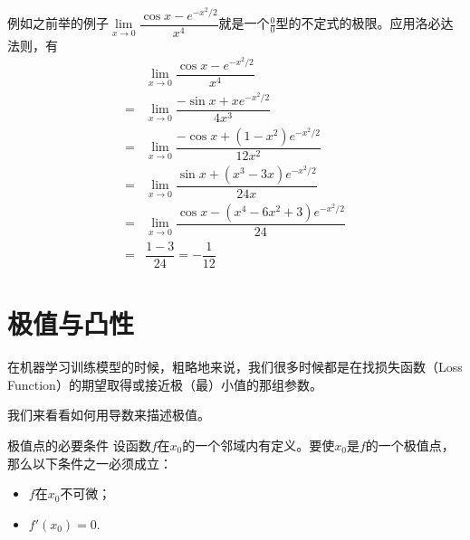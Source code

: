 
\begin{frame}

例如之前举的例子$\lim\limits_{x \to 0} \dfrac{\cos x - e^{-x^2/2}}{x^4}$就是一个$\frac{0}{0}$型的不定式的极限。应用洛必达法则，有
\begin{align*}
& \lim\limits_{x \to 0} \dfrac{\cos x - e^{-x^2/2}}{x^4} \\
= & \lim\limits_{x \to 0} \dfrac{-\sin x + xe^{-x^2/2}}{4x^3} \\
= & \lim\limits_{x \to 0} \dfrac{-\cos x + (1-x^2)e^{-x^2/2}}{12x^2} \\
= & \lim\limits_{x \to 0} \dfrac{\sin x + (x^3-3x)e^{-x^2/2}}{24x} \\
= & \lim\limits_{x \to 0} \dfrac{\cos x - (x^4-6x^2 + 3)e^{-x^2/2}}{24} \\
= & \dfrac{1-3}{24} = -\dfrac{1}{12}
\end{align*}

\end{frame}


\section{极值与凸性}


\begin{frame}

在机器学习训练模型的时候，粗略地来说，我们很多时候都是在找损失函数（Loss Function）的期望取得或接近极（最）小值的那组参数。

我们来看看如何用导数来描述极值。

\pause

\begin{block}{极值点的必要条件}
设函数$f$在$x_0$的一个邻域内有定义。要使$x_0$是$f$的一个极值点，那么以下条件之一必须成立：
\begin{itemize}
\item $f$在$x_0$不可微；
\item $f'(x_0) = 0.$
\end{itemize}
\end{block}

\end{frame}

